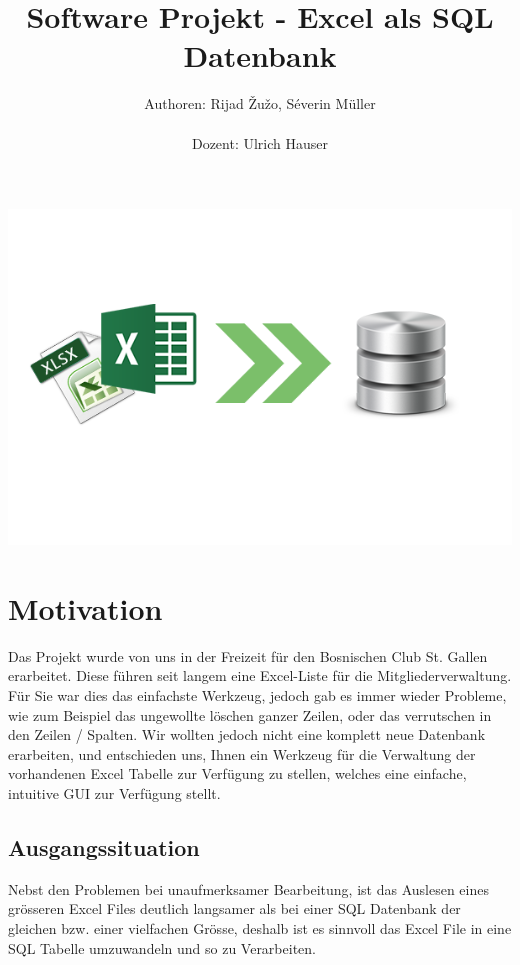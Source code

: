 \documentclass{article}
\begin{document}

\title{Software Projekt - Excel als SQL Datenbank}
\author{Authoren: Rijad \v{Z}u\v{z}o, Séverin Müller \\ \\ Dozent: Ulrich Hauser}

\maketitle

\vspace{75mm}
\begin{center}
		\includegraphics[width=0.8 \textwidth]{SoftwareLogo}
\end{center}

\newpage
\tableofcontents
\listoffigures
\newpage


\section{Motivation}
Das Projekt wurde von uns in der Freizeit für den Bosnischen Club St. Gallen erarbeitet. Diese führen seit langem eine Excel-Liste für die Mitgliederverwaltung. \newline 
Für Sie war dies das einfachste Werkzeug, jedoch gab es immer wieder Probleme, wie zum Beispiel das ungewollte löschen ganzer Zeilen, oder das verrutschen in den Zeilen / Spalten. Wir wollten jedoch nicht eine komplett neue Datenbank erarbeiten, und entschieden uns, Ihnen ein Werkzeug für die Verwaltung der vorhandenen Excel Tabelle zur Verfügung zu stellen, welches eine einfache, intuitive GUI zur Verfügung stellt.

\subsection{Ausgangssituation}
Nebst den Problemen bei unaufmerksamer Bearbeitung, ist das Auslesen eines grösseren Excel Files deutlich langsamer als bei einer SQL Datenbank der gleichen bzw. einer vielfachen Grösse, deshalb ist es sinnvoll das Excel File in eine SQL Tabelle umzuwandeln und so zu Verarbeiten.
\end{document}
